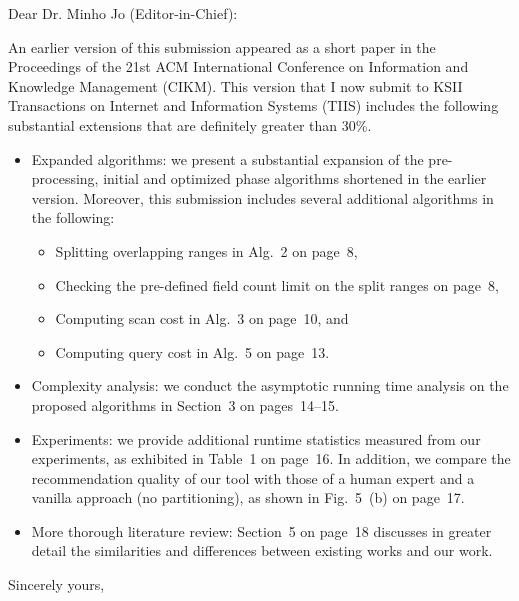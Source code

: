 \documentclass{letter} %
\begin{document}
\begin{letter}
 
\opening{Dear Dr. Minho Jo (Editor-in-Chief):} 
 
\noindent An earlier version of this submission appeared as a short paper in the Proceedings of the 21st ACM \hbox{International} Conference on Information and Knowledge Management (CIKM). 
This version that I now submit to KSII Transactions on Internet and Information Systems (TIIS) includes the following substantial extensions that are definitely greater than 30\%.

\begin{itemize}

\item Expanded algorithms: we present a substantial expansion of the pre-processing, initial and optimized phase algorithms shortened in the earlier version. Moreover, this submission includes 
several additional algorithms in the following:

\begin{itemize}

\item Splitting overlapping ranges in {\color{blue}Alg.~2} on page~8,
\item Checking the pre-defined field count limit on the split ranges on page~8,
\item Computing scan cost in {\color{blue}Alg.~3} on page~10, and
\item Computing query cost in {\color{blue}Alg.~5} on page~13.

\end{itemize} 
 
\item Complexity analysis: we conduct the asymptotic running time analysis on the proposed algorithms in Section~3 on pages~14--15.

\item Experiments: we provide additional runtime statistics measured from our experiments, as exhibited in {\color{blue}Table~1} on page~16. In addition, we compare the recommendation quality of our tool with those of a human expert and a vanilla approach (no partitioning), as shown in {\color{blue}Fig.~5~(b)} on page~17.

\item More thorough literature review: Section~5 on page~18 discusses in greater detail the similarities and differences between existing works and our work.

\end{itemize} 
 
\closing{Sincerely yours,} 

\end{letter}
 
\end{document}
